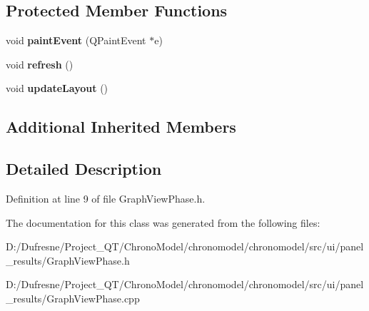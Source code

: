 \subsection*{Protected Member Functions}
\begin{DoxyCompactItemize}
\item 
\hypertarget{class_graph_view_phase_a8977fe6f286a58b6522d51ba1f396c00}{void {\bfseries paint\-Event} (Q\-Paint\-Event $\ast$e)}\label{class_graph_view_phase_a8977fe6f286a58b6522d51ba1f396c00}

\item 
\hypertarget{class_graph_view_phase_a7091fd963392255333163290d1dd918d}{void {\bfseries refresh} ()}\label{class_graph_view_phase_a7091fd963392255333163290d1dd918d}

\item 
\hypertarget{class_graph_view_phase_a7037174ef72a2fb1f3bcf9f58d428dc4}{void {\bfseries update\-Layout} ()}\label{class_graph_view_phase_a7037174ef72a2fb1f3bcf9f58d428dc4}

\end{DoxyCompactItemize}
\subsection*{Additional Inherited Members}


\subsection{Detailed Description}


Definition at line 9 of file Graph\-View\-Phase.\-h.



The documentation for this class was generated from the following files\-:\begin{DoxyCompactItemize}
\item 
D\-:/\-Dufresne/\-Project\-\_\-\-Q\-T/\-Chrono\-Model/chronomodel/chronomodel/src/ui/panel\-\_\-results/Graph\-View\-Phase.\-h\item 
D\-:/\-Dufresne/\-Project\-\_\-\-Q\-T/\-Chrono\-Model/chronomodel/chronomodel/src/ui/panel\-\_\-results/Graph\-View\-Phase.\-cpp\end{DoxyCompactItemize}
